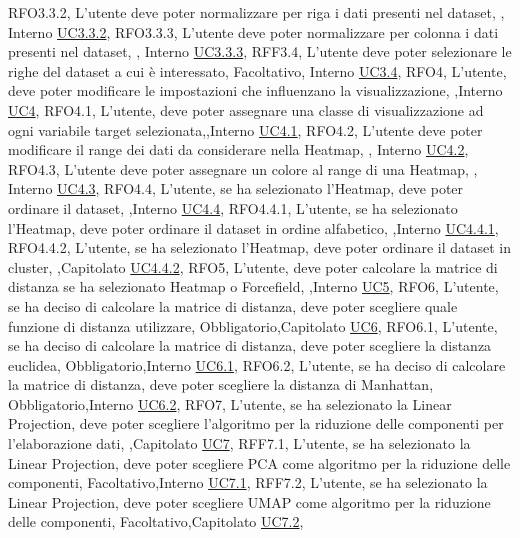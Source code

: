 {    {RFO3.3.2, L'utente deve poter normalizzare per riga i dati presenti nel dataset, \obb, Interno \noexpand\hyperref[uc3.3.2]{UC3.3.2}},
    {RFO3.3.3, L'utente deve poter normalizzare per colonna i dati presenti nel dataset, \obb, Interno \noexpand\hyperref[uc3.3.3]{UC3.3.3}},
    {RFF3.4, L'utente deve poter selezionare le righe del dataset a cui è interessato, Facoltativo, Interno \noexpand\hyperref[uc3.4]{UC3.4}},
    {RFO4, L'utente{,} deve poter modificare le impostazioni che influenzano la visualizzazione, \obb,Interno \noexpand\hyperref[uc4]{UC4}},
    {RFO4.1, L'utente{,} deve poter assegnare una classe di visualizzazione ad ogni variabile target selezionata,\obb,Interno \noexpand\hyperref[uc4.1]{UC4.1}},
    {RFO4.2, L'utente deve poter modificare il range dei dati da considerare nella Heatmap, \obb, Interno \noexpand\hyperref[uc4.2]{UC4.2}},
    {RFO4.3, L'utente deve poter assegnare un colore al range di una Heatmap, \obb, Interno \noexpand\hyperref[uc4.3]{UC4.3}},
    {RFO4.4, L'utente{,} se ha selezionato l'Heatmap{,} deve poter ordinare il dataset, \obb,Interno \noexpand\hyperref[uc4.4]{UC4.4}},
    {RFO4.4.1, L'utente{,} se ha selezionato l'Heatmap{,} deve poter ordinare il dataset in ordine alfabetico, \obb,Interno \noexpand\hyperref[uc4.4.1]{UC4.4.1}},
    {RFO4.4.2, L'utente{,} se ha selezionato l'Heatmap{,} deve poter ordinare il dataset in cluster, \obb,Capitolato \noexpand\hyperref[uc4.4.2]{UC4.4.2}},
    {RFO5, L'utente{,} deve poter calcolare la matrice di distanza se ha selezionato Heatmap o Forcefield, \obb,Interno \noexpand\hyperref[uc5]{UC5}},
    {RFO6, L'utente{,} se ha deciso di calcolare la matrice di distanza{,} deve poter scegliere quale funzione di distanza utilizzare, Obbligatorio,Capitolato \noexpand\hyperref[uc6]{UC6}},
    {RFO6.1, L'utente{,} se ha deciso di calcolare la matrice di distanza{,} deve poter scegliere la distanza euclidea, Obbligatorio,Interno \noexpand\hyperref[uc6.1]{UC6.1}},
    {RFO6.2, L'utente{,} se ha deciso di calcolare la matrice di distanza{,} deve poter scegliere la distanza di Manhattan, Obbligatorio,Interno \noexpand\hyperref[uc6.2]{UC6.2}},
    {RFO7, L'utente{,} se ha selezionato la Linear Projection{,} deve poter scegliere l'algoritmo per la riduzione delle componenti per l'elaborazione dati, \obb,Capitolato \noexpand\hyperref[uc7]{UC7}},
    {RFF7.1, L'utente{,} se ha selezionato la Linear Projection{,} deve poter scegliere PCA come algoritmo per la riduzione delle componenti, Facoltativo,Interno \noexpand\hyperref[uc7.1]{UC7.1}},
    {RFF7.2, L'utente{,} se ha selezionato la Linear Projection{,} deve poter scegliere UMAP come algoritmo per la riduzione delle componenti, Facoltativo,Capitolato \noexpand\hyperref[uc7.2]{UC7.2}},
}
